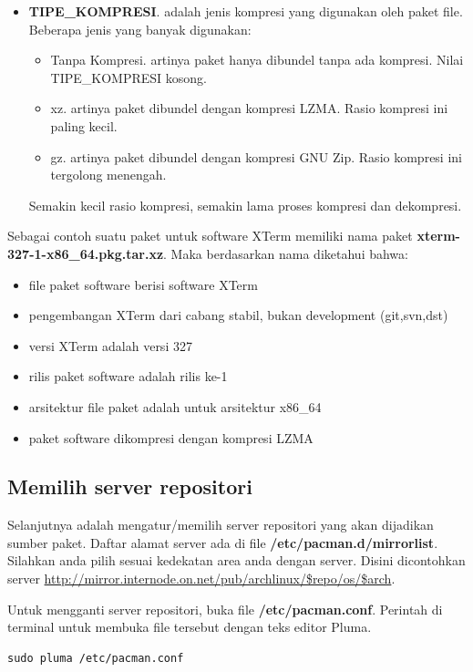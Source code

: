 \documentclass[12pt,]{article}
\begin{document}
\begin{itemize}
		\item \textbf{TIPE\_KOMPRESI}. adalah jenis kompresi yang digunakan oleh paket file.
		Beberapa jenis yang banyak digunakan:
		\begin{itemize}
			\item Tanpa Kompresi. artinya paket hanya dibundel tanpa ada kompresi.
			Nilai TIPE\_KOMPRESI kosong.
			\item xz. artinya paket dibundel dengan kompresi LZMA. Rasio kompresi ini paling kecil.
			\item gz. artinya paket dibundel dengan kompresi GNU Zip. Rasio kompresi ini tergolong menengah.
		\end{itemize}
		Semakin kecil rasio kompresi, semakin lama proses kompresi dan dekompresi.
	\end{itemize}

	Sebagai contoh suatu paket untuk software XTerm memiliki nama paket \textbf{xterm-327-1-x86\_64.pkg.tar.xz}.
	Maka berdasarkan nama diketahui bahwa:
	\begin{itemize}
		\item file paket software berisi software XTerm
		\item pengembangan XTerm dari cabang stabil, bukan development (git,svn,dst)
		\item versi XTerm adalah versi 327
		\item rilis paket software adalah rilis ke-1
		\item arsitektur file paket adalah untuk arsitektur x86\_64
		\item paket software dikompresi dengan kompresi LZMA
	\end{itemize}
		
	\subsection{Memilih server repositori}
	Selanjutnya adalah mengatur/memilih server repositori yang akan dijadikan sumber paket.
	Daftar alamat server ada di file \textbf{/etc/pacman.d/mirrorlist}.
	Silahkan anda pilih sesuai kedekatan area anda dengan server.
	Disini dicontohkan server \url{http://mirror.internode.on.net/pub/archlinux/$repo/os/$arch}.
	
	Untuk mengganti server repositori, buka file \textbf{/etc/pacman.conf}.
	Perintah di terminal untuk membuka file tersebut dengan teks editor Pluma. 
	\begin{verbatim}
sudo pluma /etc/pacman.conf
	\end{verbatim}
	
\end{document}
